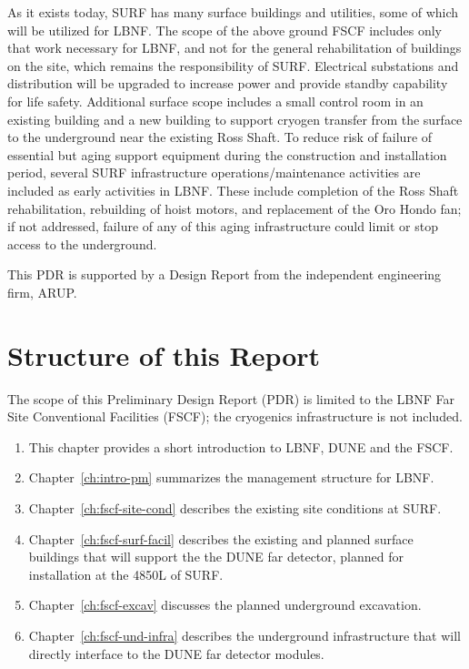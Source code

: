 As it exists today, SURF has many surface buildings and utilities, some of which will be utilized for LBNF. 
The scope of the above ground FSCF includes only that work necessary for LBNF, and not for the general 
rehabilitation of buildings on the site, which remains the responsibility of SURF. Electrical substations and 
distribution will be upgraded to increase power and provide standby capability for life safety. Additional 
surface scope includes a small control room in an existing building and a new building to support 
cryogen transfer from the surface to the underground near the existing Ross Shaft.
To reduce risk of failure of essential but aging support equipment during the construction and 
installation period, several SURF infrastructure operations/maintenance activities are included as early 
activities in LBNF. These include completion of the Ross Shaft rehabilitation, rebuilding of hoist motors, 
and replacement of the Oro Hondo fan; if not addressed, failure of any of this aging infrastructure could 
limit or stop access to the underground. 

This PDR is supported by a Design Report from the independent engineering firm, ARUP. 

\section{Structure of this Report}
\label{sec:pdr-volumes-fscf}

The scope of this Preliminary Design Report (PDR) is limited to the LBNF Far Site Conventional Facilities (FSCF); the cryogenics infrastructure is not included.
 
 \begin{enumerate}
\item This chapter provides a short introduction to LBNF, DUNE and the FSCF.
\item Chapter~\ref{ch:intro-pm} summarizes the management structure for LBNF.
\item Chapter~\ref{ch:fscf-site-cond} describes the existing site conditions at SURF. 
\item Chapter~\ref{ch:fscf-surf-facil} describes the existing and planned surface buildings that will support the the DUNE far detector, planned for installation at the 4850L of SURF.
\item Chapter~\ref{ch:fscf-excav} discusses the planned underground excavation. 
\item Chapter~\ref{ch:fscf-und-infra}  describes the underground infrastructure that will directly interface to the DUNE far detector modules.
\end{enumerate}
